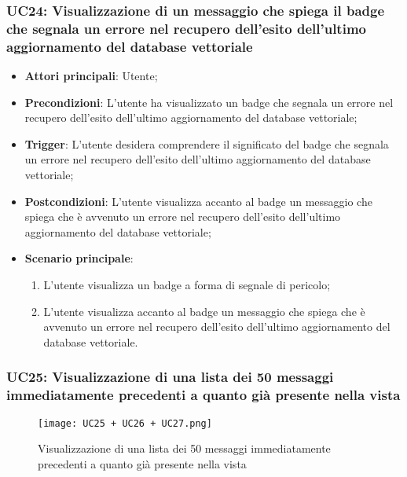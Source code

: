\subsubsection{UC24: Visualizzazione di un messaggio che spiega il badge che segnala un errore nel recupero dell'esito dell'ultimo aggiornamento del database vettoriale}
\begin{itemize}
    \item \textbf{Attori principali}: Utente;
    \item \textbf{Precondizioni}: L'utente ha visualizzato un badge che segnala un errore nel recupero dell'esito dell'ultimo aggiornamento del database vettoriale;
    \item \textbf{Trigger}: L'utente desidera comprendere il significato del badge che segnala un errore nel recupero dell'esito dell'ultimo aggiornamento del database vettoriale;
    \item \textbf{Postcondizioni}: L'utente visualizza accanto al badge un messaggio che spiega che è avvenuto un errore nel recupero dell'esito dell'ultimo aggiornamento del database vettoriale;
    \item \textbf{Scenario principale}:
    \begin{enumerate}
        \item L'utente visualizza un badge a forma di segnale di pericolo;
        \item L'utente visualizza accanto al badge un messaggio che spiega che è avvenuto un errore nel recupero dell'esito dell'ultimo aggiornamento del database vettoriale.
    \end{enumerate}
\end{itemize}

\hypertarget{UC25}{}
\subsubsection{UC25: Visualizzazione di una lista dei 50 messaggi immediatamente precedenti a quanto già presente nella vista}

\begin{figure}[h]
    \centering
    \texttt{[image: UC25 + UC26 + UC27.png]}
    \caption{Visualizzazione di una lista dei 50 messaggi immediatamente precedenti a quanto già presente nella vista}
\end{figure}

